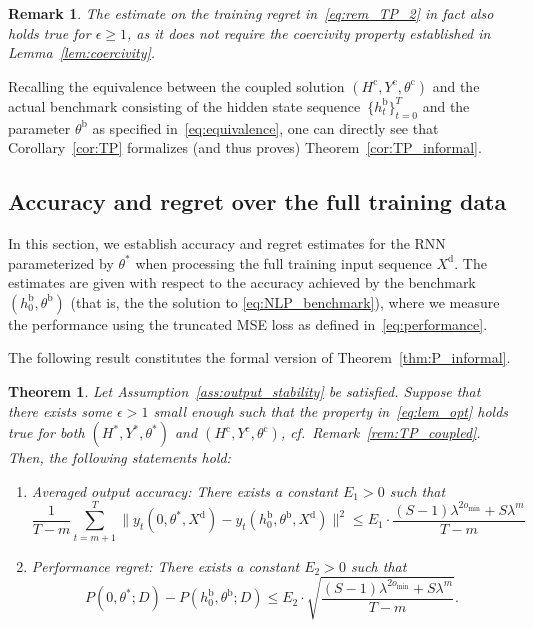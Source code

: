 \documentclass{article} %
\newtheorem{thm}{Theorem}
\newtheorem{rem}{Remark}
\begin{document}
\begin{rem}
	The estimate on the training regret in~\eqref{eq:rem_TP_2} in fact also holds true for $\epsilon\geq 1$, as it does not require the coercivity property established in Lemma~\ref{lem:coercivity}.
\end{rem}


Recalling the equivalence between the coupled solution $(H^\mathrm{c},Y^\mathrm{c},\theta^\mathrm{c})$ and the actual benchmark consisting of the hidden state sequence~$\{h^\mathrm{b}_t\}_{t=0}^T$ and the parameter $\theta^\mathrm{b}$ as specified in~\eqref{eq:equivalence}, one can directly see that Corollary~\ref{cor:TP} formalizes (and thus proves) Theorem~\ref{cor:TP_informal}.


\subsection{Accuracy and regret over the full training data}\label{app:regret_T}

In this section, we establish accuracy and regret estimates for the RNN parameterized by $\theta^*$ when processing the full training input sequence $X^\mathrm{d}$.
The estimates are given with respect to the accuracy achieved by the benchmark $(h^\mathrm{b}_0,\theta^\mathrm{b})$ (that is, the the solution to \eqref{eq:NLP_benchmark}), where we measure the performance using the truncated MSE loss as defined in~\eqref{eq:performance}.

The following result constitutes the formal version of Theorem~\ref{thm:P_informal}.

\begin{thm}\label{thm:P}
	Let Assumption~\ref{ass:output_stability} be satisfied.
	Suppose that there exists some $\epsilon>1$ small enough such that the property in~\eqref{eq:lem_opt} holds true for both $(H^*,Y^*,\theta^*)$ and $(H^\mathrm{c},Y^\mathrm{c},\theta^\mathrm{c})$, cf.~Remark~\ref{rem:TP_coupled}. Then, the following statements hold:
	\begin{enumerate}
		\item Averaged output accuracy: There exists a constant $E_1>0$ such that
		\begin{equation}\label{eq:thm_y}
			\frac{1}{T-m}\sum_{t=m+1}^{T}\|y_t(0,\theta^*,X^\mathrm{d})-y_t(h^\mathrm{b}_{0},\theta^\mathrm{b},X^\mathrm{d})\|^2 \leq  E_1 \cdot \frac{(S-1)\lambda^{2o_{\min}} + S\lambda^m}{T-m}
		\end{equation}
		\item Performance regret: There exists a constant $E_2>0$ such that
		\begin{equation}\label{eq:thm_regret}
			P(0,\theta^*;D) - P(h^\mathrm{b}_0,\theta^\mathrm{b};D) \leq  E_2\cdot \sqrt{\frac{(S-1)\lambda^{2o_{\min}} + S\lambda^m}{T-m}}.
		\end{equation}
	\end{enumerate}
\end{thm}
\end{document}
